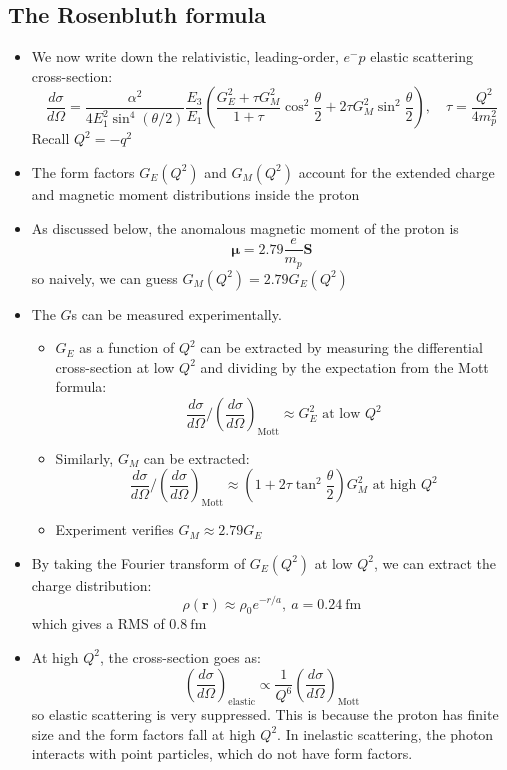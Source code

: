 \documentclass[11pt]{article}
\newcommand{\Se}{\mathbf{S}}
\newcommand{\vr}{\mathbf{r}}
\newcommand{\dd}[2]{\dfrac{d #1}{d #2}}
\newcommand{\fm}{\text{fm}}
\newcommand{\el}{\ensuremath{e^{-}}}
\begin{document}
\subsection{The Rosenbluth formula}
\begin{itemize}
  \item We now write down the relativistic, leading-order, $\el p$ elastic scattering cross-section:
  \begin{equation}
    \dd\sigma\Omega = \frac{\alpha^2}{4E_1^2\sin^4(\theta/2)}\frac{E_3}{E_1} \left(\frac{G_E^2+\tau G_M^2}{1+\tau}\cos^2\frac\theta 2 + 2\tau G_M^2\sin^2\frac\theta 2\right), \quad \tau = \frac{Q^2}{4m_p^2}
  \end{equation}
  Recall $Q^2 = -q^2$
  \item The form factors $G_E(Q^2)$ and $G_M(Q^2)$ account for the extended charge and magnetic moment distributions inside the proton
  \item As discussed below, the anomalous magnetic moment of the proton is
  \begin{equation}
    \bm\mu = 2.79 \frac{e}{m_p}\Se
  \end{equation}
  so naively, we can guess $G_M(Q^2) = 2.79 G_E(Q^2)$
  \item The $G$s can be measured experimentally. 
  \begin{itemize}
    \item $G_E$ as a function of $Q^2$ can be extracted by measuring the differential cross-section at low $Q^2$ and dividing by the expectation from the Mott formula:
    \begin{equation}
      \dd\sigma\Omega\Big/ \left(\dd\sigma\Omega\right)_\text{Mott} \approx G_E^2 \text{ at low }Q^2
    \end{equation}
    \item Similarly, $G_M$ can be extracted:
    \begin{equation}
      \dd\sigma\Omega\Big/ \left(\dd\sigma\Omega\right)_\text{Mott} \approx \left(1+2\tau\tan^2\frac\theta 2\right) G_M^2 \text{ at high }Q^2
    \end{equation}
    \item Experiment verifies $G_M \approx 2.79 G_E$
  \end{itemize}
  \item By taking the Fourier transform of $G_E(Q^2)$ at low $Q^2$, we can extract the charge distribution:
  \begin{equation}
    \rho(\vr) \approx \rho_0 e^{-r/a}, ~ a = 0.24~\fm
  \end{equation}
  which gives a RMS of $0.8~\fm$
  \item At high $Q^2$, the cross-section goes as:
  \begin{equation}
    \left(\dd\sigma\Omega\right)_\text{elastic} \propto \frac{1}{Q^6} \left(\dd\sigma\Omega\right)_\text{Mott}
  \end{equation}
  so elastic scattering is very suppressed. This is because the proton has finite size and the form factors fall at high $Q^2$. In inelastic scattering, the photon interacts with point particles, which do not have form factors.
\end{itemize}
\end{document}
